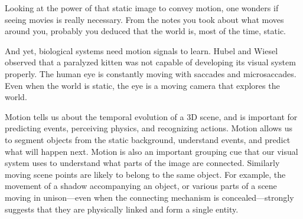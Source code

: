 Looking at the power of that static image to convey motion, one wonders if seeing movies is really necessary. From the notes you took about what moves around you, probably you deduced that the world is, most of the time, static.

And yet, biological systems need motion signals to learn. Hubel and Wiesel \cite{Wiesel1981} observed that a paralyzed kitten was not capable of developing its visual system properly. The human eye is constantly moving with saccades and microsaccades. Even when the world is static, the eye is a moving camera that explores the world.










Motion tells us about the temporal evolution of a 3D scene, and is important for predicting events, perceiving physics, and recognizing actions.
Motion allows us to segment objects from the static background, understand events, and predict what will happen next.  Motion is also an important grouping cue that our visual system uses to understand what parts of the image are connected. Similarly moving scene points are likely to belong to the same object. For example, the movement of a shadow accompanying an object, or various parts of a scene moving in unison—even when the connecting mechanism is concealed—strongly suggests that they are physically linked and form a single entity.





